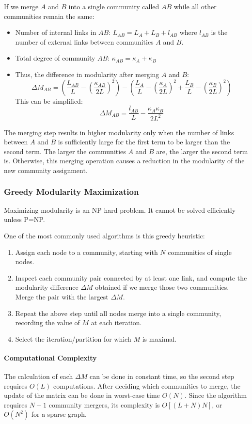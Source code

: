 \documentclass[11pt]{scrartcl} %
\begin{document}
If we merge $A$ and $B$ into a single community called ${AB}$ while all other communities remain the same:
\begin{itemize}
	\item Number of internal links in ${AB}$: $L_{AB} = L_A + L_B + l_{AB}$ where $l_{AB}$ is the number of external links between communities $A$ and $B$.
	\item Total degree of community ${AB}$: $\kappa_{AB} = \kappa_A + \kappa_B$
	\item Thus, the difference in modularity after merging $A$ and $B$:
\[ \Delta M_{AB} = \left(\frac{L_{AB}}{L} - \left( \frac{\kappa_{AB}}{2L} \right) ^2 \right) - \left( \frac{L_{A}}{L} - \left( \frac{\kappa_{A}}{2L} \right) ^2 + \frac{L_{B}}{L} - \left( \frac{\kappa_{B}}{2L} \right) ^2 \right) \]
This can be simplified:
\[ \Delta M_{AB} = \frac{l_{AB}}{L} - \frac{\kappa_{A}\kappa_{B}}{2L^2} \]
\end{itemize}

The merging step results in higher modularity only when the number of links between $A$ and $B$ is sufficiently large for the first term to be larger than the second term. The larger the communities $A$ and $B$ are, the larger the second term is. Otherwise, this merging operation causes a reduction in the modularity of the new community assignment. 

\subsubsection{Greedy Modularity Maximization}
Maximizing modularity is an NP hard problem. It cannot be solved efficiently unless P=NP. 

One of the most commonly used algorithms is this greedy heuristic:
\begin{enumerate}
	\item Assign each node to a community, starting with $N$ communities of single nodes.
	\item Inspect each community pair connected by at least one link, and compute the modularity difference $\Delta M$ obtained if we merge those two communities. Merge the pair with the largest $\Delta M$.
	\item Repeat the above step until all nodes merge into a single community, recording the value of $M$ at each iteration.
	\item Select the iteration/partition for which $M$ is maximal.
\end{enumerate}

\paragraph{Computational Complexity}
The calculation of each $\Delta M$ can be done in constant time, so the second step requires $O(L)$ computations. After deciding which communities to merge, the update of the matrix can be done in worst-case time $O(N)$. Since the algorithm requires $N-1$ community mergers, its complexity is $O[(L+N)N]$, or $O(N^2)$ for a sparse graph.
\end{document}

